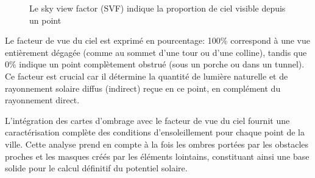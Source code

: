 {\begin{figure}[H]
    \caption{Le sky view factor (SVF) indique la proportion de ciel visible depuis un point \cite{zaksek_sky-view_2011}}
    \label{fig:cadastre_solaire_svf}
\end{figure}
\par{Le facteur de vue du ciel est exprimé en pourcentage: 100\% correspond à une vue entièrement dégagée (comme au sommet d'une tour ou d'une colline), tandis que 0\% indique un point complètement obstrué (sous un porche ou dans un tunnel). Ce facteur est crucial car il détermine la quantité de lumière naturelle et de rayonnement solaire diffus (indirect) reçue en ce point, en complément du rayonnement direct.}
\par{L'intégration des cartes d'ombrage avec le facteur de vue du ciel fournit une caractérisation complète des conditions d'ensoleillement pour chaque point de la ville. Cette analyse prend en compte à la fois les ombres portées par les obstacles proches et les masques créés par les éléments lointains, constituant ainsi une base solide pour le calcul définitif du potentiel solaire.}

}
